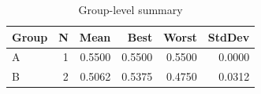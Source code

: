 \begin{table}[htbp]
\centering
\caption{Group-level summary}
\label{tab:group-summary}
\begin{tabular}{lrrrrr}
\toprule
\textbf{Group} & \textbf{N} & \textbf{Mean} & \textbf{Best} & \textbf{Worst} & \textbf{StdDev} \\
\midrule
A & 1 & 0.5500 & 0.5500 & 0.5500 & 0.0000 \\
B & 2 & 0.5062 & 0.5375 & 0.4750 & 0.0312 \\
\bottomrule
\end{tabular}
\end{table}
